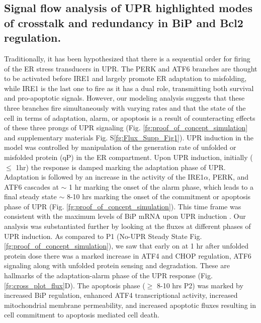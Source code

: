 \documentclass[fleqn,10pt]{wlscirep}
\begin{document}
\subsection*{Signal flow analysis of UPR highlighted modes of crosstalk and redundancy in BiP and Bcl2 regulation.}
Traditionally, it has been hypothesized that there is a sequential order for firing of the ER stress transducers in UPR. The PERK and ATF6 branches are thought to be activated before IRE1 \cite{szegezdi2006mediators} and largely promote ER adaptation to misfolding, while IRE1 is the last one to fire as it has a dual role, transmitting both survival and pro-apoptotic signals. However, our modeling analysis suggests that these three branches fire simultaneously with varying rates and that the state of the cell in terms of adaptation, alarm, or apoptosis is a result of counteracting effects of these three prongs of UPR signaling (Fig. \ref{fg:proof_of_concept_simulation} and supplementary materials Fig. S\ref{fg:Flux_Supp_Fig1}). 
UPR induction in the model was controlled by manipulation of the generation rate of unfolded or misfolded protein (qP) in the ER compartment. Upon UPR induction, initially ($\leq$ 1hr) the response is damped marking the adaptation phase of UPR. Adaptation is followed by an increase in the activity of the IRE1$\alpha$, PERK, and ATF6 cascades at $\sim$ 1 hr marking the onset of the alarm phase, which leads to a final steady state $\sim$ 8-10 hrs marking the onset of the commitment or apoptosis phase of UPR (Fig. \ref{fg:proof_of_concept_simulation}). This time frame was consistent with the maximum levels of BiP mRNA upon UPR induction \cite{lin2007ire1}. Our analysis was substantiated further by looking at the fluxes at different phases of UPR induction. As compared to P1 (No-UPR Steady State Fig. \ref{fg:proof_of_concept_simulation}), we saw that early on at 1 hr after unfolded protein dose there was a marked increase in ATF4 and CHOP regulation, ATF6 signaling along with unfolded protein sensing and degradation. These are hallmarks of the adaptation-alarm phase of the UPR response (Fig. \ref{fg:cross_plot_flux}D). The apoptosis phase ($\geq$ 8-10 hrs P2) was marked by increased BiP regulation, enhanced ATF4 transcriptional activity, increased mitochondrial membrane permeability, and increased apoptotic fluxes resulting in cell commitment to apoptosis mediated cell death. 
\end{document}
